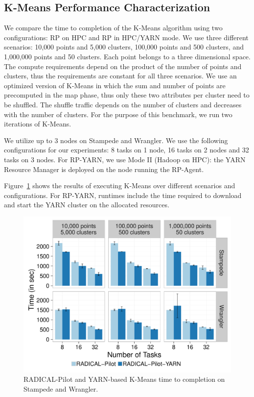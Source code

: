 \subsection{K-Means Performance Characterization}
\label{ssec:kmeans}

We compare the time to completion of the K-Means algorithm using two
configurations: RP on HPC and RP in HPC/YARN mode. We use
three different scenarios: 10,000 points and 5,000 clusters, 100,000 points and
500 clusters, and 1,000,000 points and 50 clusters. Each point belongs to a
three dimensional space. The compute requirements depend on the product of the
number of points and clusters, thus the requirements are constant for all three scenarios. We
use an optimized version of K-Means in which the sum and number of points are
precomputed in the map phase, thus only these two attributes per cluster need to
be shuffled. The shuffle traffic depends on the number of clusters and decreases
with the number of clusters. For the purpose of this benchmark, we run two
iterations of K-Means.

We utilize up to 3 nodes on Stampede and Wrangler. We use the following
configurations for our experiments: 8 tasks on 1 node, 16 tasks on 2 nodes and 32
tasks on 3 nodes. For RP-YARN, we use Mode II (Hadoop on HPC): the
YARN Resource Manager is deployed on the node running the RP-Agent.

Figure~\ref{fig:experiments_kmeans_rpyarnkmeans} shows the results of executing
K-Means over different scenarios and configurations. For RP-YARN,
runtimes include the time required to download and start the YARN cluster on the
allocated resources.

\begin{figure}[t]
    \centering
    \includegraphics[width=.75\textwidth]{figures/data_analytics_hpc/hpc_hadoop/kmeans.pdf}
    \caption{RADICAL-Pilot and YARN-based K-Means time to completion on Stampede and Wrangler.}
    \label{fig:experiments_kmeans_rpyarnkmeans}
\end{figure}

